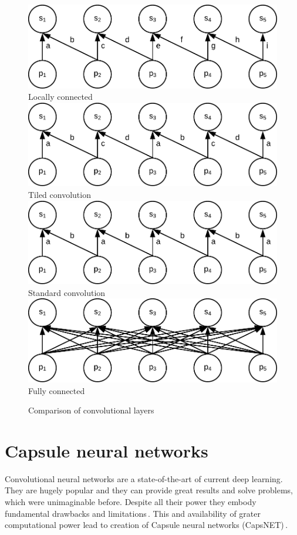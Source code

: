 \begin{figure}
    \centering
    \includegraphics[width=.6\textwidth]{obrazky-figures/locally_connected.pdf} \\
    Locally connected \\
    \bigskip
    \includegraphics[width=.6\textwidth]{obrazky-figures/convolution_tiled.pdf} \\
    Tiled convolution \\
    \bigskip
    \includegraphics[width=.6\textwidth]{obrazky-figures/convolution_std.pdf} \\
    Standard convolution \\
    \bigskip
    \includegraphics[width=.6\textwidth]{obrazky-figures/fully_connected.pdf} \\
    Fully connected \\
    \bigskip
    \caption{Comparison of convolutional layers}
    \label{fig:compare_layers}
\end{figure}

\section{Capsule neural networks}

Convolutional neural networks are a state-of-the-art of current deep learning. They are hugely popular and they can provide great results and solve problems, which were unimaginable before. Despite all their power they embody fundamental drawbacks and limitations\,\cite{capsule_compare}. This and availability of grater computational power lead to creation of Capsule neural networks (CapsNET)\,\cite{capsule}.

